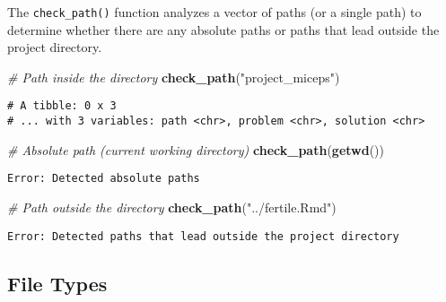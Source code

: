 \documentclass[12pt,twoside]{reedthesis}
\newenvironment{Shaded}{\begin{snugshade}}{\end{snugshade}}
\newcommand{\KeywordTok}[1]{\textcolor[rgb]{0.13,0.29,0.53}{\textbf{#1}}}
\newcommand{\StringTok}[1]{\textcolor[rgb]{0.31,0.60,0.02}{#1}}
\newcommand{\CommentTok}[1]{\textcolor[rgb]{0.56,0.35,0.01}{\textit{#1}}}
\newcommand{\NormalTok}[1]{#1}
\begin{document}
The \texttt{check\_path()} function analyzes a vector of paths (or a
single path) to determine whether there are any absolute paths or paths
that lead outside the project directory.
\begin{Shaded}
\begin{Highlighting}[]
\CommentTok{# Path inside the directory}
\KeywordTok{check_path}\NormalTok{(}\StringTok{"project_miceps"}\NormalTok{)}
\end{Highlighting}
\end{Shaded}
\begin{verbatim}
# A tibble: 0 x 3
# ... with 3 variables: path <chr>, problem <chr>, solution <chr>
\end{verbatim}
\begin{Shaded}
\begin{Highlighting}[]
\CommentTok{# Absolute path (current working directory)}
\KeywordTok{check_path}\NormalTok{(}\KeywordTok{getwd}\NormalTok{())}
\end{Highlighting}
\end{Shaded}
\begin{verbatim}
Error: Detected absolute paths
\end{verbatim}
\begin{Shaded}
\begin{Highlighting}[]
\CommentTok{# Path outside the directory}
\KeywordTok{check_path}\NormalTok{(}\StringTok{"../fertile.Rmd"}\NormalTok{)}
\end{Highlighting}
\end{Shaded}
\begin{verbatim}
Error: Detected paths that lead outside the project directory
\end{verbatim}
\subsection{File Types}\label{file-types}
\end{document}
